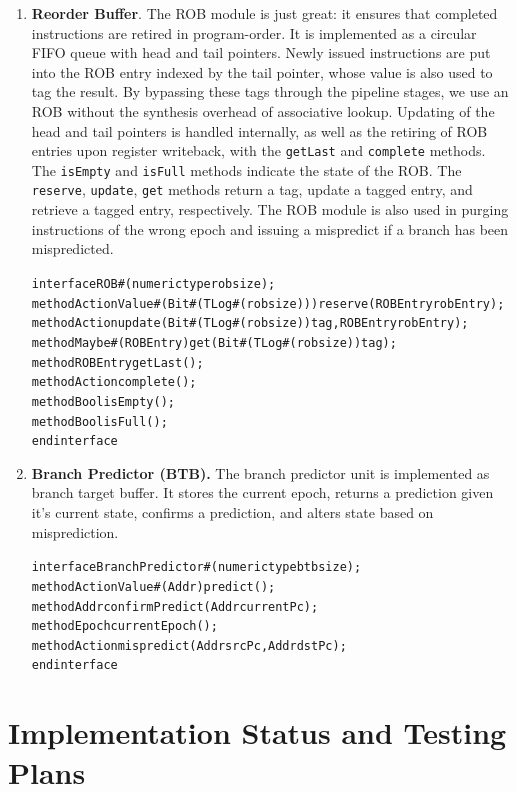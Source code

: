 \documentclass[12pt]{article}
\begin{document}
\begin{enumerate}
    \item \textbf{Reorder Buffer}. The ROB module is just great: it ensures that completed instructions are 
    retired in program-order. It is implemented as a circular FIFO queue with head and tail pointers. Newly 
    issued instructions are put into the ROB entry indexed by the tail pointer, whose value is also used 
    to tag the result. By bypassing these tags through the pipeline stages, we use an ROB without the synthesis
    overhead of associative lookup. Updating of the head and tail pointers is handled internally, as well as the 
    retiring of ROB entries upon register writeback, with the \verb=getLast= and \verb=complete= methods. 
    The \verb=isEmpty= and \verb=isFull= methods indicate the state of the ROB. The \verb=reserve=, 
    \verb=update=, \verb=get= methods return a tag, update a tagged entry, and retrieve a tagged entry,
    respectively. The ROB module is also used in purging instructions of the wrong epoch and issuing a 
    mispredict if a branch has been mispredicted.
    
    \begin{alltt}
        interface ROB#(numeric type robsize);
          method ActionValue#(Bit#(TLog#(robsize))) reserve(ROBEntry robEntry);
          method Action update(Bit#(TLog#(robsize)) tag, ROBEntry robEntry);
          method Maybe#(ROBEntry) get(Bit#(TLog#(robsize)) tag);
          method ROBEntry getLast();
          method Action complete();
          method Bool isEmpty();
          method Bool isFull();
        endinterface
    \end{alltt}
    \item \textbf{Branch Predictor (BTB).} The branch predictor unit is implemented as branch target buffer. It
    stores the current epoch, returns a prediction given it's current state, confirms a prediction, and 
    alters state based on misprediction. 
    \begin{alltt}
        interface BranchPredictor#(numeric type btbsize);
        	method ActionValue#(Addr) predict();
        	method Addr confirmPredict(Addr currentPc);
        	method Epoch currentEpoch();
        	method Action mispredict(Addr srcPc, Addr dstPc);
        endinterface
    \end{alltt}

\end{enumerate}

    \section{Implementation Status and Testing Plans}
\end{document}
